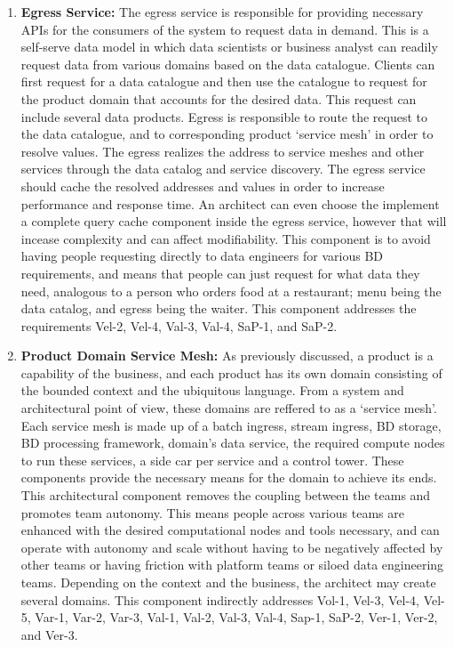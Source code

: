 \documentclass{bmcart}
\begin{document}
\begin{enumerate}
    \item \textbf{Egress Service:} The egress service is responsible for providing necessary APIs for the consumers of the system to request data in demand. This is a self-serve data model in which data scientists or business analyst can readily request data from various domains based on the data catalogue. Clients can first request for a data catalogue and then use the catalogue to request for the product domain that accounts for the desired data. This request can include several data products. Egress is responsible to route the request to the data catalogue, and to corresponding product `service mesh' in order to resolve values. The egress realizes the address to service meshes and other services through the data catalog and service discovery. The egress service should cache the resolved addresses and values in order to increase performance and response time. An architect can even choose the implement a complete query cache component inside the egress service, however that will incease complexity and can affect modifiability. This component is to avoid having people requesting directly to data engineers for various BD requirements, and means that people can just request for what data they need, analogous to a person who orders food at a restaurant; menu being the data catalog, and egress being the waiter. This component addresses the requirements Vel-2, Vel-4, Val-3, Val-4, SaP-1, and SaP-2.
    \item \textbf{Product Domain Service Mesh:} As previously discussed, a product is a capability of the business, and each product has its own domain consisting of the bounded context and the ubiquitous language. From a system and architectural point of view, these domains are reffered to as a `service mesh'. Each service mesh is made up of a batch ingress, stream ingress, BD storage, BD processing framework, domain's data service, the required compute nodes to run these services, a side car per service and a control tower. These components provide the necessary means for the domain to achieve its ends. This architectural component removes the coupling between the teams and promotes team autonomy. This means people across various teams are enhanced with the desired computational nodes and tools necessary, and can operate with autonomy and scale without having to be negatively affected by other teams or having friction with platform teams or siloed data engineering teams. Depending on the context and the business, the architect may create several domains. This component indirectly addresses Vol-1, Vel-3, Vel-4, Vel-5, Var-1, Var-2, Var-3, Val-1, Val-2, Val-3, Val-4, Sap-1, SaP-2, Ver-1, Ver-2, and Ver-3.
    

\end{enumerate}
\end{document}
